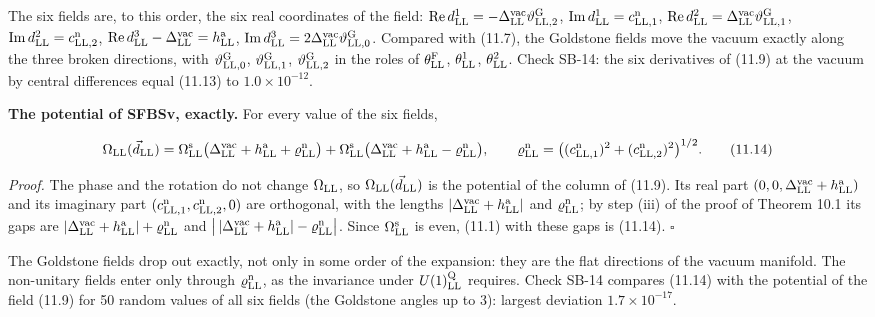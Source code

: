 \documentclass[
  10pt,
]{article}
\begin{document}
The six fields are, to this order, the six real coordinates of the
field:
\({\rm Re}\,d^1_{\rm LL}=-\Delta^{\rm vac}_{\rm LL}\vartheta^{\rm G}_{{\rm LL},2}\),
\({\rm Im}\,d^1_{\rm LL}=c^{\rm n}_{{\rm LL},1}\),
\({\rm Re}\,d^2_{\rm LL}=\Delta^{\rm vac}_{\rm LL}\vartheta^{\rm G}_{{\rm LL},1}\),
\({\rm Im}\,d^2_{\rm LL}=c^{\rm n}_{{\rm LL},2}\),
\({\rm Re}\,d^3_{\rm LL}-\Delta^{\rm vac}_{\rm LL}=h^{\rm a}_{\rm LL}\),
\({\rm Im}\,d^3_{\rm LL}=2\Delta^{\rm vac}_{\rm LL}\vartheta^{\rm G}_{{\rm LL},0}\).
Compared with (11.7), the Goldstone fields move the vacuum exactly along
the three broken directions, with \(\vartheta^{\rm G}_{{\rm LL},0}\),
\(\vartheta^{\rm G}_{{\rm LL},1}\), \(\vartheta^{\rm G}_{{\rm LL},2}\)
in the roles of \(\theta^{\rm F}_{\rm LL}\), \(\theta^1_{\rm LL}\),
\(\theta^2_{\rm LL}\). Check SB-14: the six derivatives of (11.9) at the
vacuum by central differences equal (11.13) to \(1.0\times10^{-12}\).

\textbf{The potential of SFBSv, exactly.} For every value of the six
fields,

\[\Omega_{\rm LL}(\vec d_{\rm LL})=\Omega^{\rm s}_{\rm LL}\big(\Delta^{\rm vac}_{\rm LL}+h^{\rm a}_{\rm LL}+\varrho^{\rm n}_{\rm LL}\big)+\Omega^{\rm s}_{\rm LL}\big(\Delta^{\rm vac}_{\rm LL}+h^{\rm a}_{\rm LL}-\varrho^{\rm n}_{\rm LL}\big),\qquad\varrho^{\rm n}_{\rm LL}=\big((c^{\rm n}_{{\rm LL},1})^2+(c^{\rm n}_{{\rm LL},2})^2\big)^{1/2}.\tag{11.14}\]

\emph{Proof.} The phase and the rotation do not change
\(\Omega_{\rm LL}\), so \(\Omega_{\rm LL}(\vec d_{\rm LL})\) is the
potential of the column of (11.9). Its real part
\((0,0,\Delta^{\rm vac}_{\rm LL}+h^{\rm a}_{\rm LL})\) and its imaginary
part \((c^{\rm n}_{{\rm LL},1},c^{\rm n}_{{\rm LL},2},0)\) are
orthogonal, with the lengths
\(\lvert\Delta^{\rm vac}_{\rm LL}+h^{\rm a}_{\rm LL}\rvert\) and
\(\varrho^{\rm n}_{\rm LL}\); by step (iii) of the proof of Theorem 10.1
its gaps are
\(\lvert\Delta^{\rm vac}_{\rm LL}+h^{\rm a}_{\rm LL}\rvert+\varrho^{\rm n}_{\rm LL}\)
and
\(\big\lvert\,\lvert\Delta^{\rm vac}_{\rm LL}+h^{\rm a}_{\rm LL}\rvert-\varrho^{\rm n}_{\rm LL}\big\rvert\).
Since \(\Omega^{\rm s}_{\rm LL}\) is even, (11.1) with these gaps is
(11.14). \(\square\)

The Goldstone fields drop out exactly, not only in some order of the
expansion: they are the flat directions of the vacuum manifold. The
non-unitary fields enter only through \(\varrho^{\rm n}_{\rm LL}\), as
the invariance under \(U(1)^{\rm Q}_{\rm LL}\) requires. Check SB-14
compares (11.14) with the potential of the field (11.9) for 50 random
values of all six fields (the Goldstone angles up to 3): largest
deviation \(1.7\times10^{-17}\).
\end{document}
